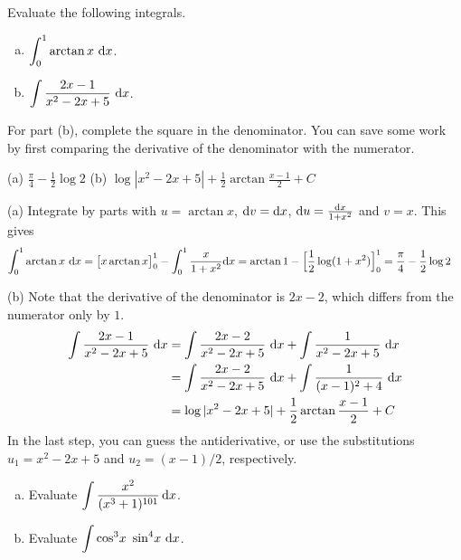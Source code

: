 \begin{question}[2013A]
Evaluate the following integrals.
\begin{enumerate}[(a)]
\item
$\displaystyle\int_0^1\arctan  x\ \dee{x}$.

\item
$\displaystyle\int\frac{2x-1}{x^2-2x+5}\ \dee{x}$.
\end{enumerate}
\end{question}

\begin{hint}
For part (b), complete the square in the denominator.
You can save some work by first comparing the derivative of the denominator
with the numerator.
\end{hint}

\begin{answer} (a)
$\displaystyle\frac{\pi}{4}-\frac{1}{2}\log 2$
\qquad (b)
$\displaystyle\log |x^2-2x+5| +\frac{1}{2}\arctan \frac{x-1}{2} +C$
\end{answer}

\begin{solution} (a)
Integrate by parts with $u=\arctan x$, $\mathrm{d}v=\mathrm{d}x$,
$\mathrm{d}u=\frac{\mathrm{d}x}{1+x^2}$ and $v=x$. This gives
\begin{align*}
\int_0^1\arctan  x\ \mathrm{d}x
&= \big[x\arctan x\big]_0^1-\int_0^1 \frac{x}{1+x^2} \mathrm{d}x
=\arctan 1-\Big[\frac{1}{2}\log(1+x^2)\Big]_0^1
=\frac{\pi}{4}-\frac{1}{2}\log 2
\end{align*}


\noindent (b)
Note that the derivative of the denominator is $2x-2$, which
differs from the numerator only by $1$.
\begin{align*}
\int\frac{2x-1}{x^2-2x+5}\ \dee{x}
&=\int\frac{2x-2}{x^2-2x+5}\ \dee{x}+\int\frac{1}{x^2-2x+5}\ \dee{x} \\
&=\int\frac{2x-2}{x^2-2x+5}\ \dee{x}+\int\frac{1}{(x-1)^2+4}\ \dee{x} \\
&=\log |x^2-2x+5| +\frac{1}{2}\arctan \frac{x-1}{2} +C
\end{align*}
In the last step, you can guess the antiderivative, or use the substitutions $u_1=x^2-2x+5$ and $u_2=(x-1)/2$, respectively.
\end{solution}

\begin{question}[2014A]
\begin{enumerate}[(a)]
\item
Evaluate ${\displaystyle \int\frac{x^2}{(x^3 + 1)^{101}}\,\mathrm{d}x}$.
\item
Evaluate $\displaystyle\int \cos^3\!x\ \sin^4\!x\ \dee{x}$.
\end{enumerate}
\end{question}

